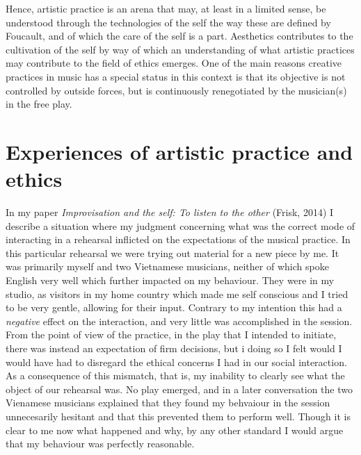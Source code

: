 \documentclass[11pt]{article}
\makeatletter
\newcommand{\cslcitation}[2]
 {\protect\hyper@linkstart{cite}{citeproc_bib_item_#1}#2\hyper@linkend}
\makeatother
\begin{document}
Hence, artistic practice is an arena that may, at least in a limited sense, be understood through the technologies of the self the way these are defined by Foucault, and of which the care of the self is a part. Aesthetics contributes to the cultivation of the self by way of which an understanding of what artistic practices may contribute to the field of ethics emerges.
One of the main reasons creative practices in music has a special status in this context is that its objective is not controlled by outside forces, but is continuously renegotiated by the musician(s) in the free play.
\section*{Experiences of artistic practice and ethics}
\label{sec:orge6cbddf}
In my paper \emph{Improvisation and the self: To listen to the other} (\cslcitation{10}{Frisk, 2014}) I describe a situation where my judgment concerning what was the correct mode of interacting in a rehearsal inflicted on the expectations of the musical practice.  In this particular rehearsal we were trying out material for a new piece by me. It was primarily myself and two Vietnamese musicians, neither of which spoke English very well which further impacted on my behaviour. They were in my studio, as visitors in my home country which made me self conscious and I tried to be very gentle, allowing for their input. Contrary to my intention this had a \emph{negative} effect on the interaction, and very little was accomplished in the session. From the point of view of the practice, in the play that I intended to initiate, there was instead an expectation of firm decisions, but i doing so I felt would I would have had to disregard the ethical concerns I had in our social interaction. As a consequence of this mismatch, that is, my inability to clearly see what the object of our rehearsal was. No play emerged, and in a later conversation the two Vienamese musicians explained that they found my behvaiour in the session unnecesarily hesitant and that this prevented them to perform well. Though it is clear to me now what happened and why, by any other standard I would argue that my behaviour was perfectly reasonable.
\end{document}
